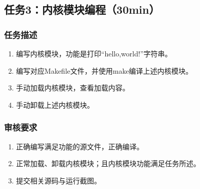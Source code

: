\documentclass{article}
\begin{document}
\newpage
\subsection{任务3：内核模块编程（30min）}
\subsubsection{任务描述}
\begin{enumerate}
	\item 编写内核模块，功能是打印“hello,world!”字符串。
	\item 编写对应Makefile文件，并使用make编译上述内核模块。
	\item 手动加载内核模块，查看加载内容。
	\item 手动卸载上述内核模块。
\end{enumerate}
\subsubsection{审核要求}
\begin{enumerate}
	\item 正确编写满足功能的源文件，正确编译。
	\item 正常加载、卸载内核模块；且内核模块功能满足任务所述。
	\item 提交相关源码与运行截图。
\end{enumerate}
\end{document}
